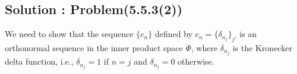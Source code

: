 \documentclass[12pt, a4paper]{article} %
\begin{document}





    \subsection{Solution : Problem(5.5.3(2))}
        We need to show that the sequence $\{e_n\}$ defined by $e_n = \{\delta_{n_j}\}_{j'}$ is an orthonormal sequence in the inner product space $\Phi$, where $\delta_{n_j}$ is the Kronecker delta function, i.e., $\delta_{n_j} = 1$ if $n=j$ and $\delta_{n_j} = 0$ otherwise.
\end{document}

